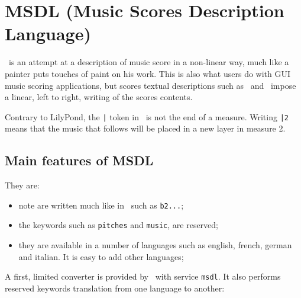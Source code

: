 



\chapter{MSDL (Music Scores Description Language)}


\msdlLang\ is an attempt at a description of music score in a non-linear way, much like a painter puts touches of paint on his work. This is also what users do with GUI music scoring applications, but scores textual descriptions such as \lily\ and \guido\ impose a linear, left to right, writing of the scores contents.

Contrary to LilyPond, the {\tt |} token in \msdlLang\ is not the end of a measure. Writing {\tt |2} means that the music that follows will be placed in a new layer in measure 2.


\section{Main features of MSDL}

They are:
\begin{itemize}
\item note are written much like in \lily\, such as {\tt b2...};
\item the keywords such as {\tt pitches} and {\tt music}, are reserved;
\item they are available in a number of languages such as english, french, german and italian. It is easy to add other languages;
\end{itemize}

A first, limited converter is provided by \mf\, with service {\tt msdl}. It also performs reserved keywords translation from one language to another:


